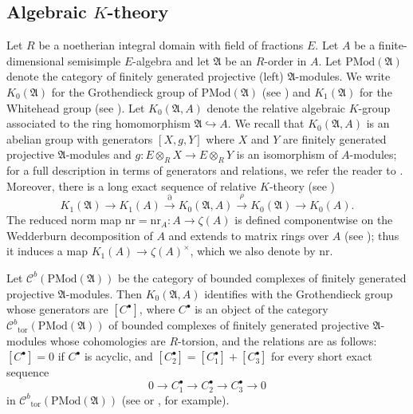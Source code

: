 \documentclass[12pt]{amsart}
\theoremstyle{plain}
\theoremstyle{remark}
\theoremstyle{definition}
\numberwithin{equation}{section}
\begin{document}
\subsection{Algebraic $K$-theory}\label{subsec:K-theory}
Let $R$ be a noetherian integral domain with field of fractions $E$.
Let $A$ be a finite-dimensional semisimple $E$-algebra and let $\mathfrak{A}$ be an $R$-order in $A$.
Let ${\mathrm{PMod}}(\mathfrak{A})$ denote the category of finitely generated projective (left) $\mathfrak{A}$-modules.
We write $K_{0}(\mathfrak{A})$ for the Grothendieck group of ${\mathrm{PMod}}(\mathfrak{A})$ (see \cite[\S 38]{MR892316})
and $K_{1}(\mathfrak{A})$ for the Whitehead group (see \cite[\S 40]{MR892316}).
Let $K_{0}(\mathfrak{A}, A)$ denote the relative algebraic $K$-group associated to the ring homomorphism
$\mathfrak{A} \hookrightarrow A$.
We recall that $K_{0}(\mathfrak{A}, A)$ is an abelian group with generators $[X,g,Y]$ where
$X$ and $Y$ are finitely generated projective $\mathfrak{A}$-modules
and $g:E \otimes_{R} X \rightarrow E \otimes_{R} Y$ is an isomorphism of $A$-modules;
for a full description in terms of generators and relations, we refer the reader to \cite[p.\ 215]{MR0245634}.
Moreover, there is a long exact sequence of relative $K$-theory (see \cite[Chapter 15]{MR0245634})
\begin{equation}\label{eqn:long-exact-seq}
K_{1}(\mathfrak{A}) \longrightarrow K_{1}(A) \stackrel{\partial}{\longrightarrow} K_{0}(\mathfrak{A}, A)
\stackrel{\rho}{\longrightarrow} K_{0}(\mathfrak{A}) \longrightarrow K_{0}(A).
\end{equation}
The reduced norm map ${\mathrm{nr}} = {\mathrm{nr}}_{A}: A \rightarrow \zeta(A)$ is defined componentwise on the Wedderburn decomposition of $A$
and extends to matrix rings over $A$ (see \cite[\S 7D]{MR632548}); thus
it induces a map $K_{1}(A) \longrightarrow \zeta(A)^{\times}$, which we also denote by ${\mathrm{nr}}$.

Let $\mathcal C^{b} ({\mathrm{PMod}} (\mathfrak{A}))$ be the category of bounded complexes of finitely generated projective $\mathfrak{A}$-modules.
Then $K_{0}(\mathfrak{A}, A)$ identifies with the Grothendieck group whose generators are $[C^{\bullet}]$, where $C^{\bullet}$
is an object of the category $\mathcal C^{b}{_{\mathrm{tor}}}({\mathrm{PMod}}(\mathfrak{A}))$ of bounded complexes of finitely generated projective $\mathfrak{A}$-modules whose cohomologies are $R$-torsion, and the relations are as follows: $[C^{\bullet}] = 0$ if $C^{\bullet}$ is acyclic, and
$[C_{2}^{\bullet}] = [C_{1}^{\bullet}] + [C_{3}^{\bullet}]$ for every short exact sequence
\begin{equation}\label{eq:SES-of-complexes}
0 \longrightarrow C_{1}^{\bullet} \longrightarrow C_{2}^{\bullet} \longrightarrow C_{3}^{\bullet} \longrightarrow 0
\end{equation}
in $\mathcal C^{b}{_{\mathrm{tor}}}({\mathrm{PMod}}(\mathfrak{A}))$ (see \cite[Chapter 2]{MR3076731} or \cite[\S 2]{zbMATH06148871}, for example).
\end{document}
